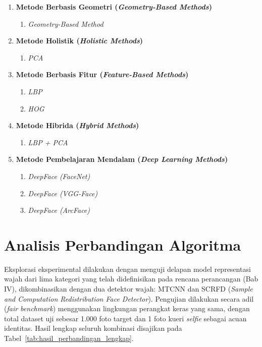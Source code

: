 \begin{enumerate}
    \item \textbf{Metode Berbasis Geometri (\textit{Geometry-Based Methods})}
    \begin{enumerate}
        \item \textit{Geometry-Based Method}
    \end{enumerate}

    \item \textbf{Metode Holistik (\textit{Holistic Methods})}
    \begin{enumerate}
        \item \textit{PCA}
    \end{enumerate}

    \item \textbf{Metode Berbasis Fitur (\textit{Feature-Based Methods})}
    \begin{enumerate}
        \item \textit{LBP}
        \item \textit{HOG}
    \end{enumerate}

    \item \textbf{Metode Hibrida (\textit{Hybrid Methods})}
    \begin{enumerate}
        \item \textit{LBP + PCA}
    \end{enumerate}

    \item \textbf{Metode Pembelajaran Mendalam (\textit{Deep Learning Methods})}
    \begin{enumerate}
        \item \textit{DeepFace (FaceNet)}
        \item \textit{DeepFace (VGG-Face)}
        \item \textit{DeepFace (ArcFace)}
    \end{enumerate}
\end{enumerate}

\section{Analisis Perbandingan Algoritma}

Eksplorasi eksperimental dilakukan dengan menguji delapan model representasi wajah dari lima kategori yang telah didefinisikan pada rencana perancangan (Bab IV), dikombinasikan dengan dua detektor wajah: MTCNN dan SCRFD (\textit{Sample and Computation Redistribution Face Detector}). Pengujian dilakukan secara adil (\textit{fair benchmark}) menggunakan lingkungan perangkat keras yang sama, dengan total dataset uji sebesar 1.000 foto target dan 1 foto kueri \textit{selfie} sebagai acuan identitas. Hasil lengkap seluruh kombinasi disajikan pada Tabel~\ref{tab:hasil_perbandingan_lengkap}.

